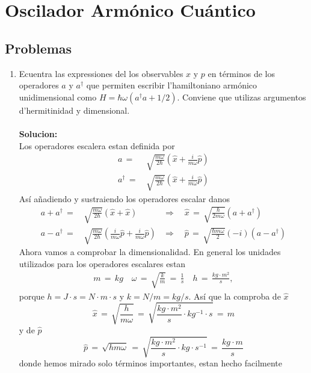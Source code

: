\chapter{Oscilador Armónico Cuántico}

\section{Problemas}

\begin{enumerate}

\item Ecuentra las expressiones del los observables $x$ y $p$ en términos de los
operadores $a$ y $a^\dagger$ que permiten escribir l'hamiltoniano armónico
unidimensional como $H = \hbar \omega (a^\dagger a + 1/2)$. Conviene que
utilizas argumentos d'hermitinidad y dimensional.	\\\\
\textbf{Solucion:} \\
Los operadores escalera estan definida por
\begin{align*}
	a \,=\,& \sqrt{\frac{m\omega}{2 \hbar}} \left( \hat x + \frac{i}{m \omega} \hat p
\right)	\\
	a^\dagger \,=\,& \sqrt{\frac{m\omega}{2 \hbar}} \left( \hat x + \frac{i}{m \omega}
\hat p\right)
\end{align*}
Así añadiendo y sustraiendo los operadores escalar danos
\begin{align*}
	a + a^\dagger \,=\,& \sqrt{\frac{m \omega}{2 \hbar}} ( \hat x + \hat x) &
\Rightarrow \quad \hat x \,=\, \sqrt{\frac{\hbar }{2 m \omega}} (a + a^\dagger) \\
	a - a^\dagger \,=\,& \sqrt{\frac{m \omega}{2 \hbar}} \left(\frac{i}{m
\omega} \hat p + \frac{i}{m \omega} \hat p \right) & \Rightarrow \quad \hat p
\,=\, \sqrt{\frac{\hbar m \omega}{2}} (-i) (a - a^\dagger)
\end{align*}
Ahora vamos a comprobar la dimensionalidad. En general los unidades utilizados
para los operadores escalares estan
\begin{align*}
	m \,=\, kg \quad \omega \,=\, \sqrt{\frac{k}{m}} \,=\, \frac{1}{s} \quad h
\,=\, \frac{kg \cdot m^2}{s},
\end{align*}
porque $h = J\cdot s = N \cdot m \cdot s$ y $k = N / m = kg / s$. Así que la
comproba de $\hat x$
\begin{equation*}
	\hat x \,=\, \sqrt{\frac{h}{m \omega}} \,=\, \sqrt{\frac{kg \cdot m^2}{s} 
\cdot kg^{-1} \cdot s} \,=\, m
\end{equation*}
y de $\hat p$
\begin{equation*}
	\hat p \,=\, \sqrt{h m \omega} \,=\, \sqrt{\frac{kg \cdot m^2}{s} \cdot kg
\cdot s^{-1}} \,=\, \frac{kg \cdot m}{s}
\end{equation*}
donde hemos mirado solo términos importantes, estan hecho facilmente
\end{enumerate}

